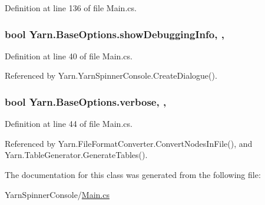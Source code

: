 Definition at line 136 of file Main.\-cs.

\hypertarget{a00035_a89964ea17bd19caf00cb5bff563ed01c}{
\subsubsection[{show\-Debugging\-Info}]{\setlength{\rightskip}{0pt plus 5cm}bool Yarn.\-Base\-Options.\-show\-Debugging\-Info\hspace{0.3cm}{\ttfamily [get]}, {\ttfamily [set]}, {\ttfamily [inherited]}}}\label{a00035_a89964ea17bd19caf00cb5bff563ed01c}


Definition at line 40 of file Main.\-cs.



Referenced by Yarn.\-Yarn\-Spinner\-Console.\-Create\-Dialogue().

\hypertarget{a00035_ada4d83d1756918f362d55f6649b82b17}{
\subsubsection[{verbose}]{\setlength{\rightskip}{0pt plus 5cm}bool Yarn.\-Base\-Options.\-verbose\hspace{0.3cm}{\ttfamily [get]}, {\ttfamily [set]}, {\ttfamily [inherited]}}}\label{a00035_ada4d83d1756918f362d55f6649b82b17}


Definition at line 44 of file Main.\-cs.



Referenced by Yarn.\-File\-Format\-Converter.\-Convert\-Nodes\-In\-File(), and Yarn.\-Table\-Generator.\-Generate\-Tables().



The documentation for this class was generated from the following file\-:\begin{DoxyCompactItemize}
\item 
Yarn\-Spinner\-Console/\hyperlink{a00313}{Main.\-cs}\end{DoxyCompactItemize}

